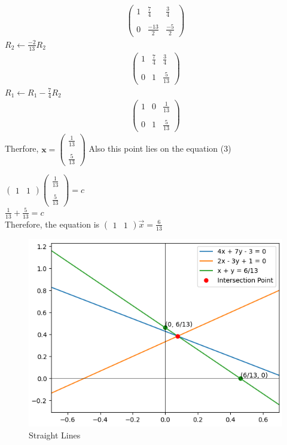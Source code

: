 \documentclass[12pt]{article}
\newcommand{\myvec}[1]{\ensuremath{\begin{pmatrix}#1\end{pmatrix}}}
\let\vec\mathbf
\begin{document}
\begin{enumerate}
\begin{align}
\begin{pmatrix}
    1 & \frac{7}{4} & \frac{3}{4} \\ \\
    0 & \frac{-13}{2} & \frac{-5}{2}
  \end{pmatrix}
\end{align}
$R_2 \leftarrow \frac{-2}{13}R_2$
\begin{align}
\begin{pmatrix}
    1 & \frac{7}{4} & \frac{3}{4} \\ \\
    0 & 1 & \frac{5}{13}
  \end{pmatrix}
\end{align}
$R_1 \leftarrow R_1-\frac{7}{4}R_2$
\begin{align}
\begin{pmatrix}
    1 & 0 & \frac{1}{13} \\ \\
    0 & 1 & \frac{5}{13}
  \end{pmatrix}
\end{align}
Therfore, $\vec{x} = \myvec{\frac{1}{13}\\ \\ \frac{5}{13}}$ Also this point lies on the equation (3)\\
\begin{center}
    $\myvec{1 & 1}\myvec{\frac{1}{13} \\ \\ \frac{5}{13}} = c$
    \vspace{\baselineskip}\\
    $\frac{1}{13}+\frac{5}{13} = c$
     \vspace{\baselineskip}\\
    Therefore, the equation is $\myvec{1&1}\Vec{x}=\frac{6}{13}$
\end{center}
\begin{figure}
    \centering
    \includegraphics[width=\columnwidth]{figs/straightline.png}
    \caption{Straight Lines}
    \label{fig:enter-label}
\end{figure}
\end{enumerate}
\end{document}
